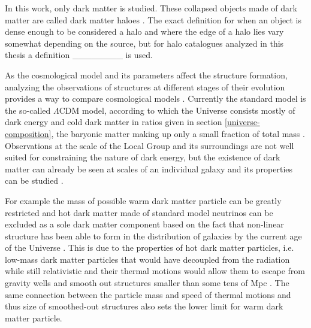 \documentclass[english, oneside]{HYgradu}
\begin{document}
In this work, only dark matter is studied. These collapsed objects made of dark matter are called dark matter haloes \citep{mo2010galaxy}. The exact definition for when an object is dense enough to be considered a halo and where the edge of a halo lies vary somewhat depending on the source, but for halo catalogues analyzed in this thesis a definition \_\_\_\_\_\_\_\_ is used. %

As the cosmological model and its parameters affect the structure formation, analyzing the observations of structures at different stages of their evolution provides a way to compare cosmological models \citep{mo2010galaxy}. Currently the standard model is the so-called $\Lambda$CDM model, according to which the Universe consists mostly of dark energy and cold dark matter in ratios given in section \ref{universe-composition}, the baryonic matter making up only a small fraction of total mass \citep{mo2010galaxy}. Observations at the scale of the Local Group and its surroundings are not well suited for constraining the nature of dark energy, but the existence of dark matter can already be seen at scales of an individual galaxy and its properties can be studied \citep{mo2010galaxy}.

For example the mass of possible warm dark matter particle can be greatly restricted \citep{kennedy2014constraining} and hot dark matter made of standard model neutrinos can be excluded as a sole dark matter component based on the fact that non-linear structure has been able to form in the distribution of galaxies by the current age of the Universe \citep{white1984is}. This is due to the properties of hot dark matter particles, i.e. low-mass dark matter particles that would have decoupled from the radiation while still relativistic  and their thermal motions would allow them to escape from gravity wells and smooth out structures smaller than some tens of Mpc \citep{mo2010galaxy}. The same connection between the particle mass and speed of thermal motions and thus size of smoothed-out structures also sets the lower limit for warm dark matter particle.




\end{document}
